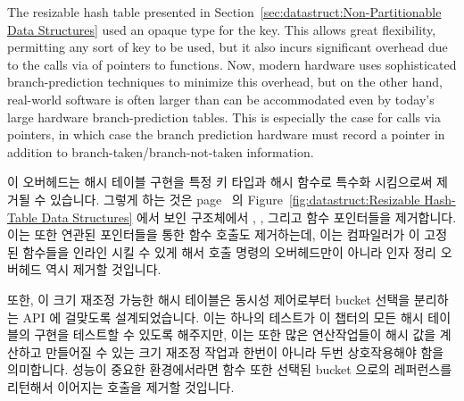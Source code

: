 The resizable hash table presented in
Section~\ref{sec:datastruct:Non-Partitionable Data Structures}
used an opaque type for the key.
This allows great flexibility, permitting any sort of key to be
used, but it also incurs significant overhead due to the calls via
of pointers to functions.
Now, modern hardware uses sophisticated branch-prediction techniques
to minimize this overhead, but on the other hand, real-world software
is often larger than can be accommodated even by today's large
hardware branch-prediction tables.
This is especially the case for calls via pointers, in which case
the branch prediction hardware must record a pointer in addition
to branch-taken/branch-not-taken information.
\fi

이 오버헤드는 해시 테이블 구현을 특정 키 타입과 해시 함수로 특수화 시킴으로써
제거될 수 있습니다.
그렇게 하는 것은
page~\pageref{fig:datastruct:Resizable Hash-Table Data Structures} 의
Figure~\ref{fig:datastruct:Resizable Hash-Table Data Structures} 에서 보인
 구조체에서 , , 그리고
 함수 포인터들을 제거합니다.
이는 또한 연관된 포인터들을 통한 함수 호출도 제거하는데, 이는 컴파일러가 이
고정된 함수들을 인라인 시킬 수 있게 해서 호출 명령의 오버헤드만이 아니라 인자
정리 오버헤드 역시 제거할 것입니다.

또한, 이 크기 재조정 가능한 해시 테이블은 동시성 제어로부터 bucket 선택을
분리하는 API 에 걸맞도록 설계되었습니다.
이는 하나의 테스트가 이 챕터의 모든 해시 테이블의 구현을 테스트할 수 있도록
해주지만, 이는 또한 많은 연산작업들이 해시 값을 계산하고 만들어질 수 있는 크기
재조정 작업과 한번이 아니라 두번 상호작용해야 함을 의미합니다.
성능이 중요한 환경에서라면  함수 또한 선택된 bucket
으로의 레퍼런스를 리턴해서 이어지는  호출을 제거할
것입니다.

